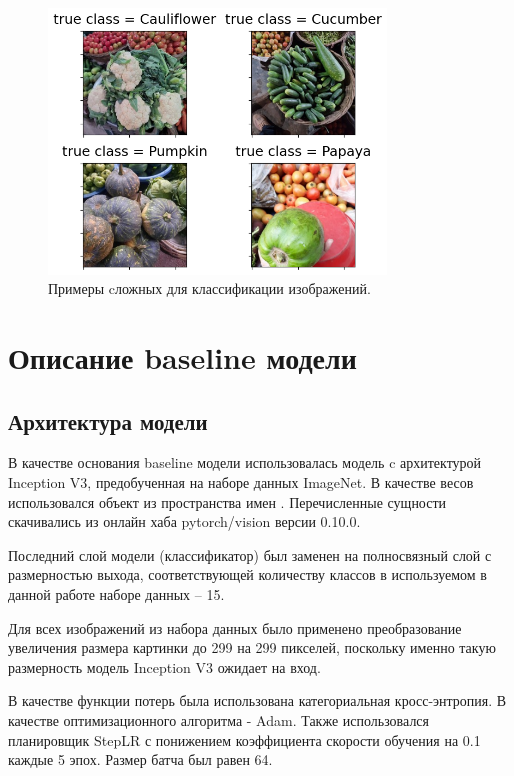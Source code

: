 \documentclass[a4paper,12pt]{extarticle}
\begin{document}
\begin{figure}[ht]
	\centering
	\includegraphics[width=0.8\textwidth]{EDA_outliers.png}
	\caption{Примеры cложных для классификации изображений.}
	\label{fig:EDA_outliers}
\end{figure}

\newpage
\section{Описание baseline модели}

\subsection{Архитектура модели}

В качестве основания baseline модели использовалась модель c архитектурой Inception V3, предобученная
на наборе данных ImageNet. В качестве весов использовался объект  из пространства имен 
. Перечисленные сущности скачивались из онлайн хаба
pytorch/vision версии 0.10.0.\par

Последний слой модели (классификатор) был заменен на полносвязный слой с размерностью выхода,
соответствующей количеству классов в используемом в данной работе наборе данных – 15.\par

Для всех изображений из набора данных было применено преобразование увеличения размера картинки до
299 на 299 пикселей, поскольку именно такую размерность модель Inception V3 ожидает на вход.\par

В качестве функции потерь была использована категориальная кросс-энтропия. В качестве
оптимизационного алгоритма - Adam. Также использовался планировщик StepLR с понижением коэффициента
скорости обучения на 0.1 каждые 5 эпох. Размер батча был равен 64.
\end{document}
